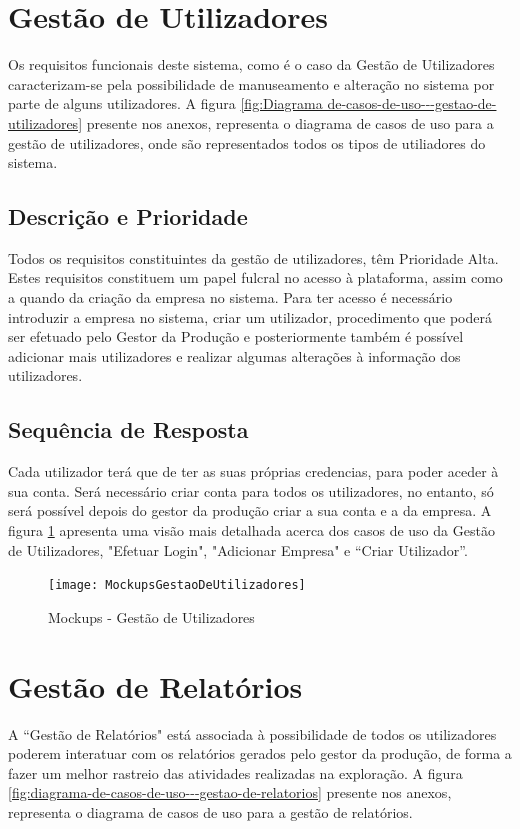 \documentclass{scrreprt}
\begin{document}
	
	\section{Gestão de Utilizadores}
	Os requisitos funcionais deste sistema, como é o caso da Gestão de Utilizadores caracterizam-se pela possibilidade de manuseamento e alteração no sistema por parte de alguns utilizadores. A figura \ref{fig:Diagrama de-casos-de-uso---gestao-de-utilizadores} presente nos anexos, representa o diagrama de casos de uso para a gestão de 
	utilizadores, onde são representados todos os tipos de utiliadores do sistema.
		
		
	\subsection{Descrição e Prioridade}
	Todos os requisitos constituintes da gestão de utilizadores, têm Prioridade Alta. Estes requisitos constituem um papel fulcral no acesso à plataforma, assim como a quando da criação da empresa no sistema. Para ter acesso é necessário introduzir a empresa no sistema, criar um utilizador, procedimento que 
	poderá ser efetuado pelo Gestor da Produção e posteriormente também é possível adicionar mais utilizadores e realizar algumas alterações à informação dos 
	utilizadores.
	
	\subsection{Sequência de Resposta}
	Cada utilizador terá que de ter as suas próprias credencias, para poder aceder à sua conta. Será necessário criar conta para todos os utilizadores, no entanto, só será possível depois do gestor da produção criar a sua conta e a da empresa. A figura \ref{fig:mockupsgestaodeutilizadores} apresenta uma visão mais detalhada acerca dos casos de uso da Gestão de Utilizadores, "Efetuar Login", "Adicionar Empresa" e “Criar Utilizador”.
	
	\begin{figure}[!h]
		\centering
		\texttt{[image: MockupsGestaoDeUtilizadores]}
		\caption{Mockups - Gestão de Utilizadores}
		\label{fig:mockupsgestaodeutilizadores}
	\end{figure}
	
	\section{Gestão de Relatórios}
	A “Gestão de Relatórios" está associada à possibilidade de todos os utilizadores poderem interatuar com os relatórios gerados pelo gestor da produção, de forma a fazer um melhor rastreio das atividades realizadas na exploração. A figura \ref{fig:diagrama-de-casos-de-uso---gestao-de-relatorios} presente nos anexos, representa o diagrama de casos de uso para a gestão de relatórios.
	
\end{document}
